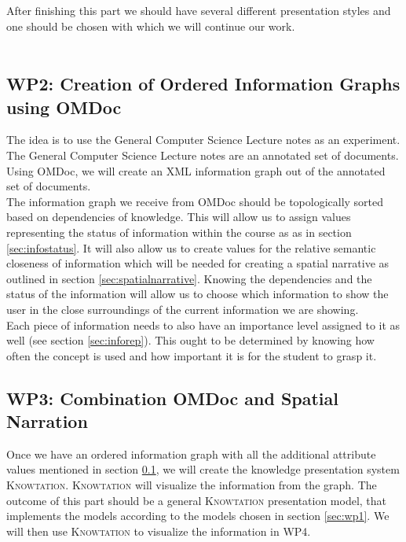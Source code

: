 \documentclass[twoside]{article}
\newcommand{\sys}{\textsc{Knowtation}\xspace}
\begin{document}
After finishing this part we should have several different presentation styles and one should be chosen with which we will continue our work.\\ 

\\

\subsection{WP2: Creation of Ordered Information Graphs using OMDoc}
\label{sec:wp2}

The idea is to use the General Computer Science Lecture notes \cite{Kohlhase:GenCSI:base} as an experiment. The General Computer Science Lecture notes are an annotated set of documents. Using OMDoc, we will create an XML information graph out of the annotated set of documents.\\

The information graph we receive from OMDoc should be topologically sorted based on dependencies of knowledge. This will allow us to assign values representing the status of information within the course as as in section \ref{sec:infostatus}. It will also allow us to create values for the relative semantic closeness of information which will be needed for creating a spatial narrative as outlined in section \ref{sec:spatialnarrative}. Knowing the dependencies and the status of the information will allow us to choose which information to show the user in the close surroundings of the current information we are showing.\\

Each piece of information needs to also have an importance level assigned to it as well (see section \ref{sec:inforep}). This ought to be determined by knowing how often the concept is used and how important it is for the student to grasp it.\\

\subsection{WP3: Combination OMDoc and Spatial Narration}
\label{sec:wp3}

Once we have an ordered information graph with all the additional attribute values mentioned in section \ref{sec:wp2}, we will create the knowledge presentation system \sys. \sys will visualize the information from the graph. The outcome of this part should be a general \sys presentation model, that implements the models according to the models chosen in section \ref{sec:wp1}. We will then use \sys to visualize the information in WP4.\\
\end{document}
